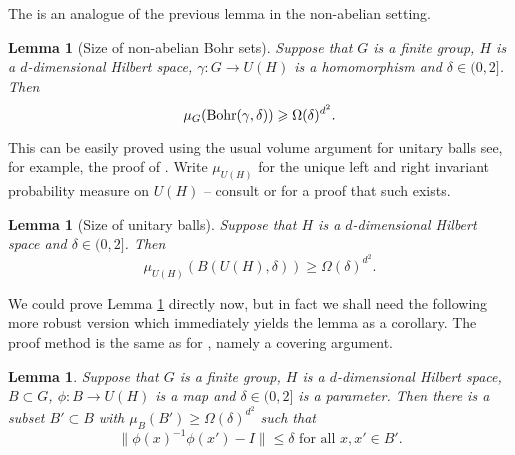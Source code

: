 \documentclass[12pt]{amsart}
\numberwithin{equation}{section}
\theoremstyle{plain}
\newtheorem{lemma}[subsection]{Lemma}
\theoremstyle{definition}
\renewcommand{\leq}{\leqslant}
\renewcommand{\geq}{\geqslant}
\providecommand{\Bohr}{\mathop{\rm Bohr}\nolimits}
\begin{document}
The is an analogue of the previous lemma in the non-abelian setting.
\begin{lemma}[Size of non-abelian Bohr sets]\label{lem.bohrs}
Suppose that $G$ is a finite group, $H$ is a $d$-dimensional Hilbert space, $\gamma:G \rightarrow U(H)$ is a homomorphism and $\delta \in (0,2]$. Then
\begin{equation*}
\mu_G(\Bohr(\gamma,\delta)) \geq \Omega(\delta)^{d^2}.
\end{equation*}
\end{lemma}
This can be easily proved using the usual volume argument for unitary balls see, for example, the proof of \cite[Theorem 4.7]{WTG}.  Write $\mu_{U(H)}$ for the unique left and right invariant probability measure on $U(H)$ -- consult \cite{HW, PRM} or \cite{MLM} for a proof that such exists.
\begin{lemma}[Size of unitary balls]\label{lem.unitaryballsize}
Suppose that $H$ is a $d$-dimensional Hilbert space and $\delta \in (0,2]$. Then
\begin{equation*}
 \mu_{U(H)}(B(U(H),\delta)) \geq \Omega(\delta)^{d^2}.
\end{equation*}
\end{lemma}
We could prove Lemma \ref{lem.bohrs} directly now, but in fact we shall need the following more robust version which immediately yields the lemma as a corollary.  The proof method is the same as for \cite[Lemma 4.19]{TCTVHV}, namely a covering argument.
\begin{lemma}\label{lem.bohraverage}
Suppose that $G$ is a finite group, $H$ is a $d$-dimensional Hilbert space, $B \subset G$, $\phi:B \rightarrow U(H)$ is a map and $\delta \in (0,2]$ is a parameter. Then there is a subset $B' \subset B$ with $\mu_B(B') \geq \Omega(\delta)^{d^2}$ such that
\begin{equation*}
\|\phi(x)^{-1}\phi(x') - I\| \leq \delta \textrm{ for all } x,x' \in B'.
\end{equation*}
\end{lemma}
\end{document}
